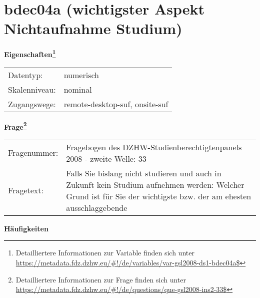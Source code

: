 
    \setcounter{footnote}{0}

    \vspace*{-1.8cm}
	\section{bdec04a (wichtigster Aspekt Nichtaufnahme Studium)}
	\label{section:bdec04a}



    \vspace*{0.5cm}
    \noindent\textbf{Eigenschaften\footnote{Detailliertere Informationen zur Variable finden sich unter
		\url{https://metadata.fdz.dzhw.eu/\#!/de/variables/var-gsl2008-ds1-bdec04a$}}}\\
	\begin{tabularx}{\hsize}{@{}lX}
	Datentyp: & numerisch \\
	Skalenniveau: & nominal \\
	Zugangswege: &
	  remote-desktop-suf, 
	  onsite-suf
 \\
    \end{tabularx}



				\vspace*{0.5cm}
                \noindent\textbf{Frage\footnote{Detailliertere Informationen zur Frage finden sich unter
		              \url{https://metadata.fdz.dzhw.eu/\#!/de/questions/que-gsl2008-ins2-33$}}}\\
				\begin{tabularx}{\hsize}{@{}lX}
					Fragenummer: &
					  Fragebogen des DZHW-Studienberechtigtenpanels 2008 - zweite Welle:
					  33
 \\
					Fragetext: & Falls Sie bislang nicht studieren und auch in Zukunft kein Studium aufnehmen werden: Welcher Grund ist für Sie der wichtigste bzw. der am ehesten ausschlaggebende \\
				\end{tabularx}





        		\vspace*{0.5cm}
                \noindent\textbf{Häufigkeiten}

